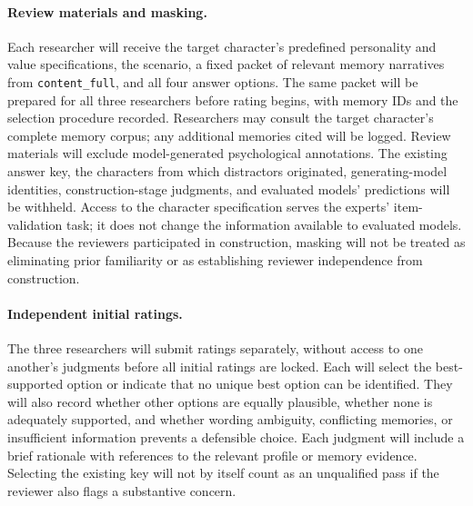 \documentclass[11pt]{article}
\begin{document}
\paragraph{Review materials and masking.}
Each researcher will receive the target character's predefined personality and value specifications, the scenario, a fixed packet of relevant memory narratives from \texttt{content\_full}, and all four answer options. The same packet will be prepared for all three researchers before rating begins, with memory IDs and the selection procedure recorded. Researchers may consult the target character's complete memory corpus; any additional memories cited will be logged. Review materials will exclude model-generated psychological annotations. The existing answer key, the characters from which distractors originated, generating-model identities, construction-stage judgments, and evaluated models' predictions will be withheld. Access to the character specification serves the experts' item-validation task; it does not change the information available to evaluated models. Because the reviewers participated in construction, masking will not be treated as eliminating prior familiarity or as establishing reviewer independence from construction.

\paragraph{Independent initial ratings.}
The three researchers will submit ratings separately, without access to one another's judgments before all initial ratings are locked. Each will select the best-supported option or indicate that no unique best option can be identified. They will also record whether other options are equally plausible, whether none is adequately supported, and whether wording ambiguity, conflicting memories, or insufficient information prevents a defensible choice. Each judgment will include a brief rationale with references to the relevant profile or memory evidence. Selecting the existing key will not by itself count as an unqualified pass if the reviewer also flags a substantive concern.
\end{document}
